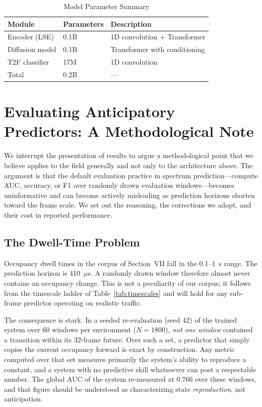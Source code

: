 \documentclass[lettersize,journal]{IEEEtran}
\newcommand{\us}{\ensuremath{\mu}s}
\begin{document}
\begin{table}[t]
\centering
\caption{Model Parameter Summary}
\label{tab:params}
\renewcommand{\arraystretch}{1.2}
\begin{tabular}{@{}lll@{}}
\toprule
\textbf{Module} & \textbf{Parameters} & \textbf{Description} \\
\midrule
Encoder (LSE)   & 0.1B & 1D convolution + Transformer \\
Diffusion model & 0.1B & Transformer with conditioning \\
T2F classifier  & 17M  & 1D convolution \\
\midrule
Total           & 0.2B & --- \\
\bottomrule
\end{tabular}
\end{table}

\section{\textbf{Evaluating Anticipatory Predictors: A Methodological Note}}

We interrupt the presentation of results to argue a methodological point
that we believe applies to the field generally and not only to the
architecture above. The argument is that the default evaluation practice
in spectrum prediction---compute AUC, accuracy, or F1 over randomly drawn
evaluation windows---becomes uninformative and can become actively
misleading as prediction horizons shorten toward the frame scale. We set
out the reasoning, the corrections we adopt, and their cost in reported
performance.

\subsection{The Dwell-Time Problem}
Occupancy dwell times in the corpus of Section~VII fall in the 0.1--1~s
range. The prediction horizon is 410~\us. A randomly drawn window
therefore almost never contains an occupancy change. This is not a
peculiarity of our corpus; it follows from the timescale ladder of
Table~\ref{tab:timescales} and will hold for any sub-frame predictor
operating on realistic traffic.

The consequence is stark. In a seeded re-evaluation (seed 42) of the
trained system over 60 windows per environment ($N = 1800$), \emph{not
one window} contained a transition within its 32-frame future. Over such
a set, a predictor that simply copies the current occupancy forward is
exact by construction. Any metric computed over that set measures
primarily the system's ability to reproduce a constant, and a system
with no predictive skill whatsoever can post a respectable number. The
global AUC of the system re-measured at 0.766 over these windows, and
that figure should be understood as characterizing state
\emph{reproduction}, not anticipation.
\end{document}
